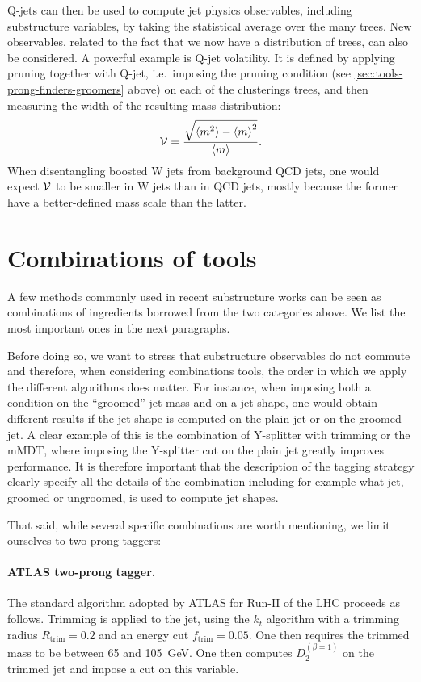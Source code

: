 Q-jets can then be used to compute jet physics observables, including
substructure variables, by taking the statistical average over the many
trees. New observables, related to the fact that we now have a
distribution of trees, can also be considered.
%
A powerful example is Q-jet volatility. It is defined by applying
pruning together with Q-jet, i.e.\ imposing the pruning condition (see
\ref{sec:tools-prong-finders-groomers} above) on each of the
clusterings trees, and then measuring the width of the resulting mass
distribution:
\begin{equation}\label{eq:Qjet-volatility}
  {\cal {V}} = \frac{\sqrt{\left\langle\smash{m^2}\right\rangle-\left\langle\smash{m}\right\rangle^2}}{\left\langle\smash{m}\right\rangle}.
\end{equation}
When disentangling boosted W jets from background QCD jets, one
would expect ${\cal{V}}$ to be smaller in W jets than in QCD jets,
mostly because the former have a better-defined mass scale than the
latter.


\section{Combinations of tools}\label{sec:tools-combinations}

A few methods commonly used in recent substructure works can be seen as
combinations of ingredients borrowed from  the two categories above.
%
We list the most important ones in the next paragraphs.

Before doing so, we want to stress that substructure observables do not commute and therefore, when considering combinations tools, the order
in which we apply the different algorithms does matter. 
%
For instance, when imposing both a condition on the ``groomed'' jet mass and on a
jet shape, one would obtain different results if the jet shape is
computed on the plain jet or on the groomed jet.
%
A clear example of this is the combination of Y-splitter with
trimming or the mMDT, where imposing the Y-splitter cut on the
plain jet greatly improves performance.
%
It is therefore important that the description of the tagging strategy
clearly specify all the details of the combination including for
example what jet, groomed or ungroomed, is used to compute jet shapes.


That said, while several specific combinations are worth mentioning, we
limit ourselves to two-prong taggers:

\paragraph{ATLAS two-prong tagger.} The standard algorithm adopted by
ATLAS for Run-II of the LHC proceeds as follows.  Trimming is applied
to the jet, using the $k_t$ algorithm with a trimming radius
$R_{\text{trim}}=0.2$ and an energy cut $f_{\text{trim}}=0.05$. One
then requires the trimmed mass to be between 65 and 105~GeV. One then
computes $D_2^{(\beta=1)}$ on the trimmed jet and impose a cut on this
variable.
